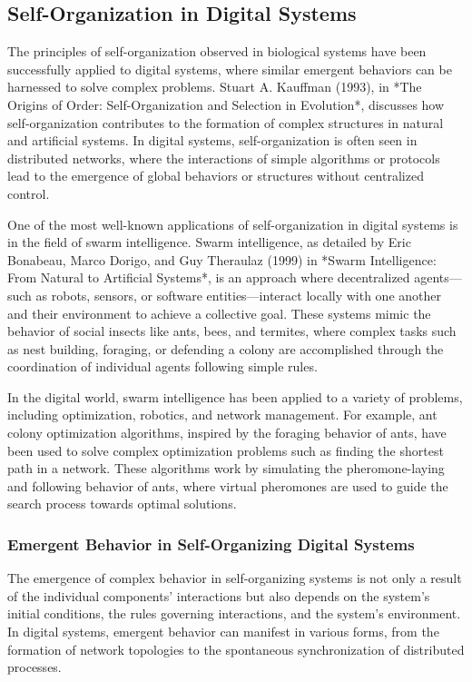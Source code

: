 \documentclass[12pt,twoside]{article}
\begin{document}
\subsection{Self-Organization in Digital Systems}

The principles of self-organization observed in biological systems have been successfully applied to digital systems, where similar emergent behaviors can be harnessed to solve complex problems. Stuart A. Kauffman (1993), in *The Origins of Order: Self-Organization and Selection in Evolution*, discusses how self-organization contributes to the formation of complex structures in natural and artificial systems. In digital systems, self-organization is often seen in distributed networks, where the interactions of simple algorithms or protocols lead to the emergence of global behaviors or structures without centralized control.

One of the most well-known applications of self-organization in digital systems is in the field of swarm intelligence. Swarm intelligence, as detailed by Eric Bonabeau, Marco Dorigo, and Guy Theraulaz (1999) in *Swarm Intelligence: From Natural to Artificial Systems*, is an approach where decentralized agents—such as robots, sensors, or software entities—interact locally with one another and their environment to achieve a collective goal. These systems mimic the behavior of social insects like ants, bees, and termites, where complex tasks such as nest building, foraging, or defending a colony are accomplished through the coordination of individual agents following simple rules.

In the digital world, swarm intelligence has been applied to a variety of problems, including optimization, robotics, and network management. For example, ant colony optimization algorithms, inspired by the foraging behavior of ants, have been used to solve complex optimization problems such as finding the shortest path in a network. These algorithms work by simulating the pheromone-laying and following behavior of ants, where virtual pheromones are used to guide the search process towards optimal solutions.

\subsubsection{Emergent Behavior in Self-Organizing Digital Systems}

The emergence of complex behavior in self-organizing systems is not only a result of the individual components' interactions but also depends on the system's initial conditions, the rules governing interactions, and the system's environment. In digital systems, emergent behavior can manifest in various forms, from the formation of network topologies to the spontaneous synchronization of distributed processes.
\end{document}

